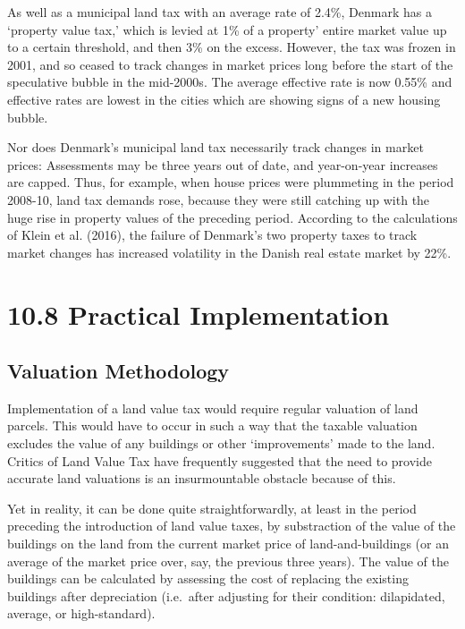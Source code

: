 \documentclass[]{tufte-handout}
\begin{document}
As well as a municipal land tax with an average rate of 2.4\%, Denmark
has a `property value tax,' which is levied at 1\% of a property' entire
market value up to a certain threshold, and then 3\% on the excess.
However, the tax was frozen in 2001, and so ceased to track changes in
market prices long before the start of the speculative bubble in the
mid-2000s. The average effective rate is now 0.55\% and effective rates
are lowest in the cities which are showing signs of a new housing
bubble.

Nor does Denmark's municipal land tax necessarily track changes in
market prices: Assessments may be three years out of date, and
year-on-year increases are capped. Thus, for example, when house prices
were plummeting in the period 2008-10, land tax demands rose, because
they were still catching up with the huge rise in property values of the
preceding period. According to the calculations of Klein et al. (2016),
the failure of Denmark's two property taxes to track market changes has
increased volatility in the Danish real estate market by 22\%.

\hypertarget{practical-implementation}{%
\section{10.8 Practical Implementation}\label{practical-implementation}}

\hypertarget{valuation-methodology}{%
\subsection{Valuation Methodology}\label{valuation-methodology}}

Implementation of a land value tax would require regular valuation of
land parcels. This would have to occur in such a way that the taxable
valuation excludes the value of any buildings or other `improvements'
made to the land. Critics of Land Value Tax have frequently suggested
that the need to provide accurate land valuations is an insurmountable
obstacle because of this.

Yet in reality, it can be done quite straightforwardly, at least in the
period preceding the introduction of land value taxes, by substraction
of the value of the buildings on the land from the current market price
of land-and-buildings (or an average of the market price over, say, the
previous three years). The value of the buildings can be calculated by
assessing the cost of replacing the existing buildings after
depreciation (i.e.~after adjusting for their condition: dilapidated,
average, or high-standard).
\end{document}
